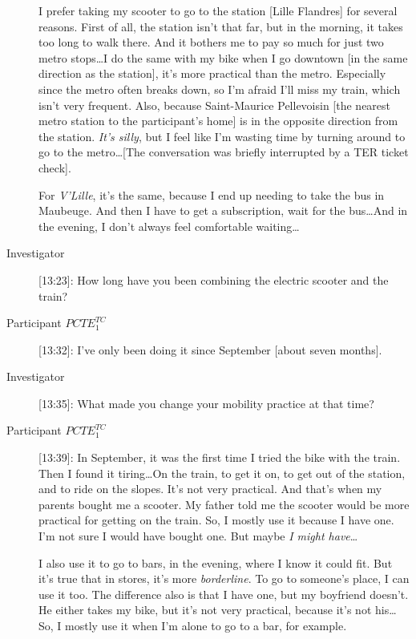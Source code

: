 \begin{description}
    I prefer taking my scooter to go to the station [Lille Flandres] for several reasons. First of all, the station isn’t that far, but in the morning, it takes too long to walk there. And it bothers me to pay so much for just two metro stops\dots I do the same with my bike when I go downtown [in the same direction as the station], it’s more practical than the metro. Especially since the metro often breaks down, so I’m afraid I’ll miss my train, which isn’t very frequent. Also, because Saint-Maurice Pellevoisin [the nearest metro station to the participant's home] is in the opposite direction from the station. \textsl{It’s silly}, but I feel like I’m wasting time by turning around to go to the metro\dots [The conversation was briefly interrupted by a \acrshort{TER} ticket check].
    
    For \textsl{V'Lille}, it’s the same, because I end up needing to take the bus in Maubeuge. And then I have to get a subscription, wait for the bus\dots And in the evening, I don’t always feel comfortable waiting\dots
    \item[Investigator] [13:23]: How long have you been combining the electric scooter and the train?
    \item[Participant \(PCTE^{TC}_{1}\)] [13:32]: I’ve only been doing it since September [about seven months].
    \item[Investigator] [13:35]: What made you change your mobility practice at that time?
    \item[Participant \(PCTE^{TC}_{1}\)] [13:39]: In September, it was the first time I tried the bike with the train. Then I found it tiring\dots On the train, to get it on, to get out of the station, and to ride on the slopes. It’s not very practical. And that’s when my parents bought me a scooter. My father told me the scooter would be more practical for getting on the train. So, I mostly use it because I have one. I’m not sure I would have bought one. But maybe \textsl{I might have}\dots%

    I also use it to go to bars, in the evening, where I know it could fit. But it’s true that in stores, it’s more \textsl{borderline}. To go to someone’s place, I can use it too. The difference also is that I have one, but my boyfriend doesn’t. He either takes my bike, but it’s not very practical, because it’s not his\dots So, I mostly use it when I’m alone to go to a bar, for example.%
    

\end{description}
